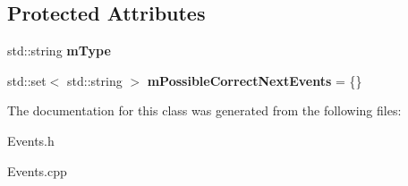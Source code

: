 \subsection*{Protected Attributes}
\begin{DoxyCompactItemize}
\item 
\mbox{\label{classUserEvent_a587f493f4e1179b28114d6b001857569}} 
std\+::string {\bfseries m\+Type}
\item 
\mbox{\label{classUserEvent_a854dd5059f7c0f9edb7a59721cedd5a2}} 
std\+::set$<$ std\+::string $>$ {\bfseries m\+Possible\+Correct\+Next\+Events} = \{\}
\end{DoxyCompactItemize}


The documentation for this class was generated from the following files\+:\begin{DoxyCompactItemize}
\item 
Events.\+h\item 
Events.\+cpp\end{DoxyCompactItemize}
